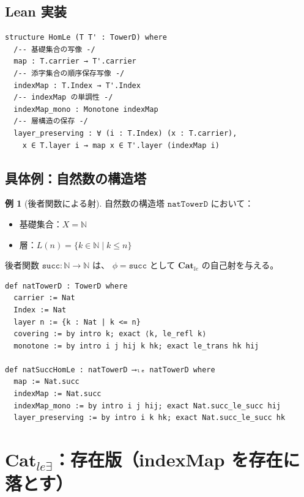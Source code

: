 \documentclass{ltjsarticle}
\theoremstyle{definition}
\newtheorem{example}[definition]{例}
\newcommand{\catle}{\mathbf{Cat}_{le}}
\newcommand{\catleexists}{\mathbf{Cat}_{le\exists}}
\newcommand{\HomLe}{\mathtt{HomLe}}
\begin{document}
\subsection{Lean 実装}

\begin{lstlisting}[caption=$\HomLe$ の Lean 定義（Cat\_le.lean より）]
structure HomLe (T T' : TowerD) where
  /-- 基礎集合の写像 -/
  map : T.carrier → T'.carrier
  /-- 添字集合の順序保存写像 -/
  indexMap : T.Index → T'.Index
  /-- indexMap の単調性 -/
  indexMap_mono : Monotone indexMap
  /-- 層構造の保存 -/
  layer_preserving : ∀ (i : T.Index) (x : T.carrier),
    x ∈ T.layer i → map x ∈ T'.layer (indexMap i)
\end{lstlisting}

\subsection{具体例：自然数の構造塔}

\begin{example}[後者関数による射]
自然数の構造塔 $\mathtt{natTowerD}$ において：
\begin{itemize}
  \item 基礎集合：$X = \mathbb{N}$
  \item 層：$L(n) = \{k \in \mathbb{N} \mid k \leq n\}$
\end{itemize}
後者関数 $\mathtt{succ} : \mathbb{N} \to \mathbb{N}$ は、
$\phi = \mathtt{succ}$ として $\catle$ の自己射を与える。
\end{example}

\begin{lstlisting}[caption=自然数の構造塔と後者射（Cat\_le.lean より）]
def natTowerD : TowerD where
  carrier := Nat
  Index := Nat
  layer n := {k : Nat | k <= n}
  covering := by intro k; exact ⟨k, le_refl k⟩
  monotone := by intro i j hij k hk; exact le_trans hk hij

def natSuccHomLe : natTowerD ⟶ₗₑ natTowerD where
  map := Nat.succ
  indexMap := Nat.succ
  indexMap_mono := by intro i j hij; exact Nat.succ_le_succ hij
  layer_preserving := by intro i k hk; exact Nat.succ_le_succ hk
\end{lstlisting}

\section{$\catleexists$：存在版（indexMap を存在に落とす）}
\end{document}
